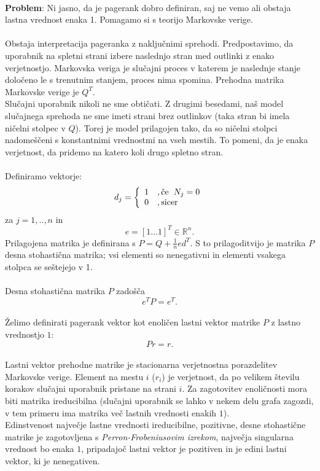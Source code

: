 \documentclass[a4paper]{article}
\begin{document}
\\ \textbf{Problem}: Ni jasno, da je pagerank dobro definiran, saj ne vemo ali obstaja lastna vrednost enaka 1. Pomagamo si s teorijo Markovske verige.\\
\\Obstaja interpretacija pageranka z naključnimi sprehodi. Predpostavimo, da uporabnik na spletni strani izbere naslednjo stran  med outlinki z enako verjetnostjo. Markovska veriga je slučajni proces v katerem je naslednje stanje določeno le s trenutnim stanjem, proces nima spomina. Prehodna matrika Markovske verige je $Q^T$.\\
Slučajni uporabnik nikoli ne sme obtičati. Z drugimi besedami, naš model slučajnega sprehoda ne sme imeti strani brez outlinkov (taka stran bi imela ničelni stolpec v $Q$). Torej je model prilagojen tako, da so ničelni stolpci nadomeščeni s konstantnimi vrednostmi na vseh mestih. To pomeni, da je enaka verjetnost, da pridemo na katero koli drugo spletno stran. \\ 
\\Definiramo vektorje: \\
\[
d_j = 
\left \{
	\begin{array}{ll}
		1  &, \mbox{če}\hspace{2mm} N_j = 0 \\
		0 &, \mbox{sicer} 
	\end{array}
\right. \]
za $j = 1, .., n$ in
$$e = [1 … 1] ^T \in \mathbb{R}^n.$$
Prilagojena matrika je definirana s $ P = Q + \frac{1}{n}ed^T$. 
S to prilagoditvijo je matrika $P$ desna stohastična matrika; vsi elementi so nenegativni in elementi vsakega stolpca se seštejejo v 1. \\
\\Desna stohastična matrika $P$ zadošča 
$$e^TP = e^T.$$ \\
Želimo definirati pagerank vektor kot enoličen lastni vektor matrike $P$ z lastno vrednostjo $1$:
$$Pr=r.$$ \\
Lastni vektor prehodne matrike je stacionarna verjetnostna porazdelitev Markovske verige. Element na mestu $i$ ($r_i$) je verjetnost, da po velikem številu korakov slučajni uporabnik pristane na strani $i$. Za zagotovitev enoličnosti mora biti matrika ireducibilna (slučajni uporabnik se lahko v nekem delu grafa zagozdi, v tem primeru ima matrika več lastnih vrednosti enakih $1$). \\ Edinstvenost največje lastne vrednosti ireducibilne, pozitivne, desne stohastične matrike je zagotovljena s \textit{Perron-Frobeniusovim izrekom}, največja singularna vrednost bo enaka $1$, pripadajoč lastni vektor je pozitiven in je edini lastni vektor, ki je nenegativen. \\
\end{document}
